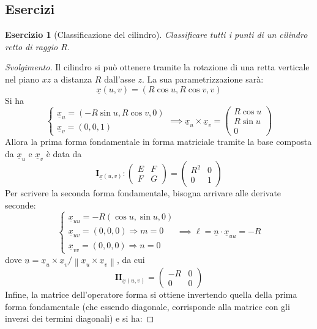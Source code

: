 \documentclass[12pt]{scrartcl}
\theoremstyle{style}
\newtheorem{esercizio}{Esercizio}[section]
\newenvironment{svolgimento}{\renewcommand\qedsymbol{$\blacksquare$}\begin{proof}[Svolgimento]}{\end{proof}}
\numberwithin{equation}{subsection}
\begin{document}
\subsection{Esercizi}
\begin{esercizio}
	[Classificazione del cilindro]
	Classificare tutti i punti di un cilindro retto di raggio $R$.
\end{esercizio}
\begin{svolgimento}
	Il cilindro si pu\`o ottenere tramite la rotazione di una retta verticale nel piano $xz$ a distanza $R$ dall'asse $z$.
	La sua parametrizzazione sar\`a:
	\[
	\underline{x}(u,v) = (R \cos u, R\cos v , v)
	\] 
	Si ha
	\[
	\begin{cases}
		\underline{x}_u = (-R \sin u , R \cos v, 0 )\\
		\underline{x}_v = (0,0,1)
	\end{cases}\implies \underline{x}_u \times \underline{x}_v = \begin{pmatrix} R \cos u\\ R \sin u \\ 0 \end{pmatrix} 
	\] 
Allora la prima forma fondamentale in forma matriciale tramite la base composta da $\underline{x}_u$ e $\underline{x}_v$ \`e data da
\[
	\mathbf{I} _{\underline{x}(u,v)} : \begin{pmatrix} E & F \\ F & G \end{pmatrix} = \begin{pmatrix} R^2 & 0 \\ 0 & 1 \end{pmatrix} 
\] 
Per scrivere la seconda forma fondamentale, bisogna arrivare alle derivate seconde:
\[
\begin{cases}
	\underline{x}_{uu} = - R (\cos u, \sin u ,0)\\
	\underline{x}_{uv} = (0,0,0) \Rightarrow m = 0\\
	\underline{x}_{v v } = (0,0,0) \Rightarrow n =0
\end{cases}\implies \ell = \underline{n}\cdot \underline{x}_{uu}  = - R
\] 
dove $\underline{n} = \underline{x}_u \times \underline{x}_v / \left\lVert \underline{x}_u \times \underline{x}_v \right\rVert $, da cui
\[
	\mathbf{I I} _{\underline{x}(u,v)} = \begin{pmatrix} -R & 0 \\ 0 & 0  \end{pmatrix} 
\] 
Infine, la matrice dell'operatore forma si ottiene invertendo quella della prima forma fondamentale (che essendo diagonale, corrisponde alla matrice con gli inversi dei termini diagonali) e si ha:

\end{svolgimento}
\end{document}
